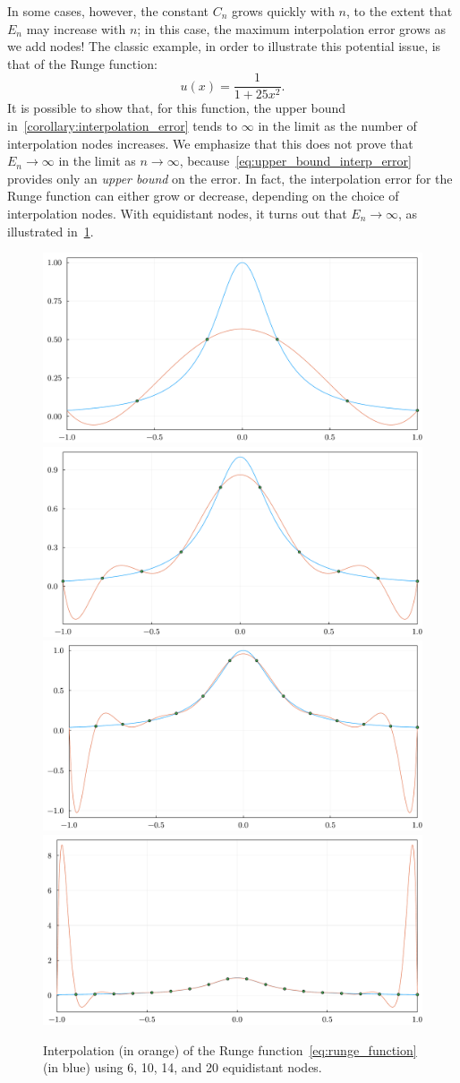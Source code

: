 In some cases, however,
the constant $C_n$ grows quickly with $n$,
to the extent that $E_n$ may increase with $n$;
in this case, the maximum interpolation error grows as we add nodes!
The classic example,
in order to illustrate this potential issue,
is that of the Runge function:
\begin{equation}
    \label{eq:runge_function}
    u(x) = \frac{1}{1 + 25 x^2}.
\end{equation}
It is possible to show that,
for this function,
the upper bound in~\cref{corollary:interpolation_error} tends to $\infty$ in the limit as the number of interpolation nodes increases.
We emphasize that this does not prove that $E_n \to \infty$ in the limit as $n \to \infty$,
because~\eqref{eq:upper_bound_interp_error} provides only an \emph{upper bound} on the error.
In fact, the interpolation error for the Runge function can either grow or decrease,
depending on the choice of interpolation nodes.
With equidistant nodes, it turns out that $E_n \to \infty$,
as illustrated in~\cref{fig:interpolation_runge_function}.
\begin{figure}[ht!]
    \centering
    \includegraphics[width=0.49\linewidth]{figures/interpolation_runge_6.pdf}
    \includegraphics[width=0.49\linewidth]{figures/interpolation_runge_10.pdf}
    \includegraphics[width=0.49\linewidth]{figures/interpolation_runge_14.pdf}
    \includegraphics[width=0.49\linewidth]{figures/interpolation_runge_20.pdf}
    \caption{Interpolation (in orange) of the Runge function~\eqref{eq:runge_function} (in blue) using 6, 10, 14, and 20 equidistant nodes.}%
    \label{fig:interpolation_runge_function}
\end{figure}

